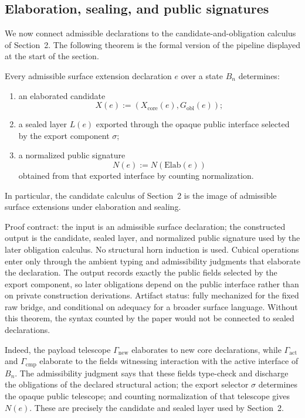 \documentclass{lmcs}
\begin{document}
\subsection{Elaboration, sealing, and public signatures}

We now connect admissible declarations to the candidate-and-obligation calculus of
Section~2.  The following theorem is the formal version of the pipeline displayed at the
start of the section.

\begin{thm}
Every admissible surface extension declaration \(e\) over a state \(B_n\) determines:
\begin{enumerate}
\item an elaborated candidate
\[
  X(e) := (X_{\mathrm{core}}(e),G_{\mathrm{obl}}(e));
\]
\item a sealed layer \(L(e)\) exported through the opaque public interface selected by the
export component \(\sigma\);
\item a normalized public signature
\[
  N(e) := N(\mathrm{Elab}(e))
\]
obtained from that exported interface by counting normalization.
\end{enumerate}
In particular, the candidate calculus of Section~2 is the image of admissible surface
extensions under elaboration and sealing.

Proof contract: the input is an admissible surface declaration; the constructed
output is the candidate, sealed layer, and normalized public signature used by
the later obligation calculus.  No structural horn induction is used.  Cubical
operations enter only through the ambient typing and admissibility judgments
that elaborate the declaration.  The output records exactly the public fields
selected by the export component, so later obligations depend on the public
interface rather than on private construction derivations.  Artifact status:
fully mechanized for the fixed raw bridge, and conditional on adequacy for a
broader surface language.  Without this theorem, the syntax counted by the
paper would not be connected to sealed declarations.
\end{thm}

Indeed, the payload telescope \(\Gamma_{\mathrm{new}}\) elaborates to new core declarations,
while \(\Gamma_{\mathrm{act}}\) and \(\Gamma_{\mathrm{cmp}}\) elaborate to the fields witnessing
interaction with the active interface of \(B_n\).  The admissibility judgment says that these
fields type-check and discharge the obligations of the declared structural action; the export
selector \(\sigma\) determines the opaque public telescope; and counting normalization of that
telescope gives \(N(e)\).  These are precisely the candidate and sealed layer used by
Section~2.
\end{document}

